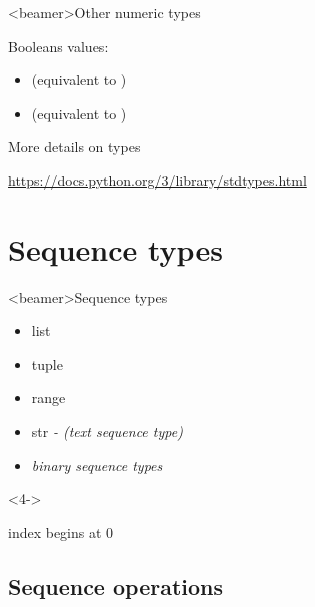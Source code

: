 
\begin{frame}<beamer>{Other numeric types}

  Booleans values:
  \begin{itemize}
    \item<1->  (equivalent to )
    \item<1->  (equivalent to )
  \end{itemize}

  \bigskip

    \begin{center}
    More details on types

    \medskip

    \url{https://docs.python.org/3/library/stdtypes.html}
    \end{center}

\end{frame}


\section{Sequence types}

\begin{frame}<beamer>{Sequence types}

  \begin{itemize}
    \item<1-> list
    \item<1-> tuple
    \item<1-> range
    \item<2-> str \textit{- (text sequence type)}
    \item<3-> \textit{binary sequence types}
  \end{itemize}

  \bigskip

  \begin{center}
    \begin{onlyenv}<4->

    index begins at 0

    \end{onlyenv}
  \end{center}

\end{frame}


\subsection{Sequence operations}

